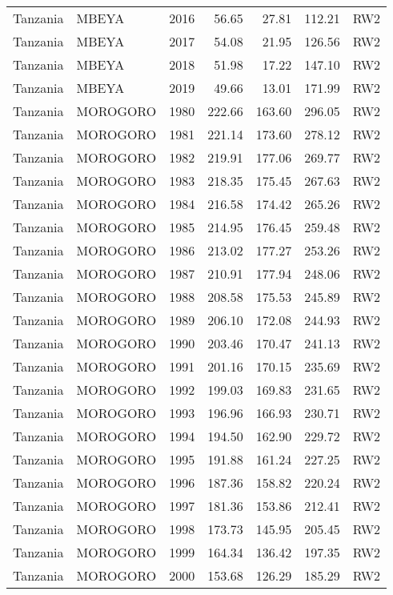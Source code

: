\begin{longtable}{lllrrrl}
  Tanzania & MBEYA & 2016 & 56.65 & 27.81 & 112.21 & RW2 \\ 
  Tanzania & MBEYA & 2017 & 54.08 & 21.95 & 126.56 & RW2 \\ 
  Tanzania & MBEYA & 2018 & 51.98 & 17.22 & 147.10 & RW2 \\ 
  Tanzania & MBEYA & 2019 & 49.66 & 13.01 & 171.99 & RW2 \\ 
  Tanzania & MOROGORO & 1980 & 222.66 & 163.60 & 296.05 & RW2 \\ 
  Tanzania & MOROGORO & 1981 & 221.14 & 173.60 & 278.12 & RW2 \\ 
  Tanzania & MOROGORO & 1982 & 219.91 & 177.06 & 269.77 & RW2 \\ 
  Tanzania & MOROGORO & 1983 & 218.35 & 175.45 & 267.63 & RW2 \\ 
  Tanzania & MOROGORO & 1984 & 216.58 & 174.42 & 265.26 & RW2 \\ 
  Tanzania & MOROGORO & 1985 & 214.95 & 176.45 & 259.48 & RW2 \\ 
  Tanzania & MOROGORO & 1986 & 213.02 & 177.27 & 253.26 & RW2 \\ 
  Tanzania & MOROGORO & 1987 & 210.91 & 177.94 & 248.06 & RW2 \\ 
  Tanzania & MOROGORO & 1988 & 208.58 & 175.53 & 245.89 & RW2 \\ 
  Tanzania & MOROGORO & 1989 & 206.10 & 172.08 & 244.93 & RW2 \\ 
  Tanzania & MOROGORO & 1990 & 203.46 & 170.47 & 241.13 & RW2 \\ 
  Tanzania & MOROGORO & 1991 & 201.16 & 170.15 & 235.69 & RW2 \\ 
  Tanzania & MOROGORO & 1992 & 199.03 & 169.83 & 231.65 & RW2 \\ 
  Tanzania & MOROGORO & 1993 & 196.96 & 166.93 & 230.71 & RW2 \\ 
  Tanzania & MOROGORO & 1994 & 194.50 & 162.90 & 229.72 & RW2 \\ 
  Tanzania & MOROGORO & 1995 & 191.88 & 161.24 & 227.25 & RW2 \\ 
  Tanzania & MOROGORO & 1996 & 187.36 & 158.82 & 220.24 & RW2 \\ 
  Tanzania & MOROGORO & 1997 & 181.36 & 153.86 & 212.41 & RW2 \\ 
  Tanzania & MOROGORO & 1998 & 173.73 & 145.95 & 205.45 & RW2 \\ 
  Tanzania & MOROGORO & 1999 & 164.34 & 136.42 & 197.35 & RW2 \\ 
  Tanzania & MOROGORO & 2000 & 153.68 & 126.29 & 185.29 & RW2 \\ 

\end{longtable}
